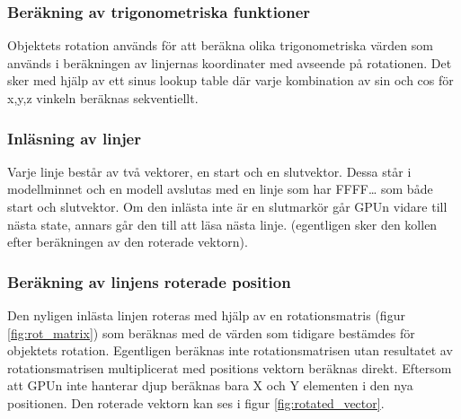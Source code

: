 \documentclass[a4paper]{article}
\begin{document}
    \subsubsection{Beräkning av trigonometriska funktioner}
    Objektets rotation används för att beräkna olika trigonometriska värden som
    används i beräkningen av linjernas koordinater med avseende på rotationen. Det
    sker med hjälp av ett sinus lookup table där varje kombination av sin och cos
    för x,y,z vinkeln beräknas sekventiellt. 

    \subsubsection{Inläsning av linjer}
    Varje linje består  av två vektorer, en start och en slutvektor. Dessa står i
    modellminnet och en modell avslutas med en linje som har FFFF… som både start
    och slutvektor. Om den inlästa inte är en slutmarkör går GPUn vidare till nästa
    state, annars går den till att läsa nästa  linje. (egentligen sker den kollen
    efter beräkningen av den  roterade vektorn). 

    \subsubsection{Beräkning av linjens roterade position}
    Den nyligen inlästa linjen roteras med hjälp av en rotationsmatris (figur
    \ref{fig:rot_matrix}) som beräknas med de värden som tidigare bestämdes för
    objektets rotation. Egentligen beräknas inte rotationsmatrisen utan
    resultatet av rotationsmatrisen multiplicerat med positions vektorn beräknas
    direkt. Eftersom att GPUn inte hanterar djup beräknas bara X och  Y
    elementen i den nya positionen. Den roterade vektorn kan ses i
    figur \ref{fig:rotated_vector}. 
\end{document}
